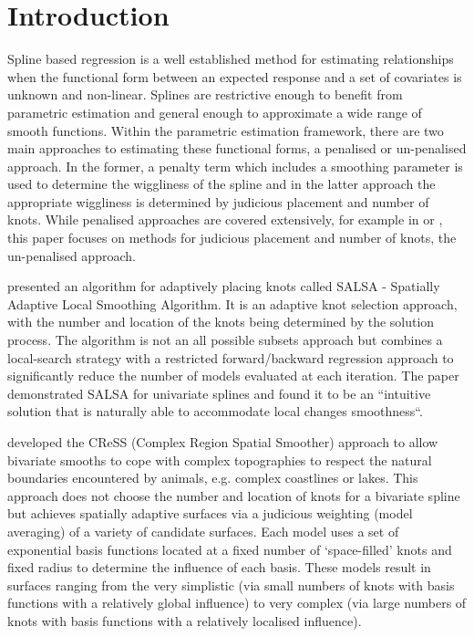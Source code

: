 \documentclass[letterpaper, 12pt]{interact}
\begin{document}
	
	
	\newpage
	
	\section*{Introduction}
	Spline based regression is a well established method for estimating relationships when the functional form between an expected response and a set of covariates is unknown and non-linear. Splines are restrictive enough to benefit from parametric estimation and general enough to approximate a wide range of smooth functions. Within the parametric estimation framework, there are two main approaches to estimating these functional forms, a penalised or un-penalised approach.  In the former, a penalty term which includes a smoothing parameter is used to determine the wiggliness of the spline and in the latter approach the appropriate wiggliness is determined by judicious placement and number of knots. While penalised approaches are covered extensively, for example in \citet{wood2017} or \citet{eilers2010}, this paper focuses on methods for judicious placement and number of knots, the un-penalised approach. 
	
	\citet{Walk2010} presented an algorithm for adaptively placing knots called SALSA - Spatially Adaptive Local Smoothing Algorithm. It is an adaptive knot selection approach, with the number and location of the knots being determined by the solution process. The algorithm is not an all possible subsets approach but combines a local-search strategy with a restricted forward/backward regression approach to significantly reduce the number of models evaluated at each iteration. The paper demonstrated SALSA for univariate splines and found it to be an ``intuitive solution that is naturally able to accommodate local changes smoothness``. 
	
	\citet{scott2014} developed the CReSS (Complex Region Spatial Smoother) approach to allow bivariate smooths to cope with complex topographies to respect the natural boundaries encountered by animals, e.g. complex coastlines or lakes. This approach does not choose the number and location of knots for a bivariate spline but achieves spatially adaptive surfaces via a judicious weighting (model averaging) of a variety of candidate surfaces.  Each model uses a set of exponential basis functions located at a fixed number of `space-filled' knots \cite{Johnson1990} and fixed radius to determine the influence of each basis. These models result in surfaces ranging from the very simplistic (via small numbers of knots with basis functions with a relatively global influence) to very complex (via large numbers of knots with basis functions with a relatively localised influence).
	
\end{document}
